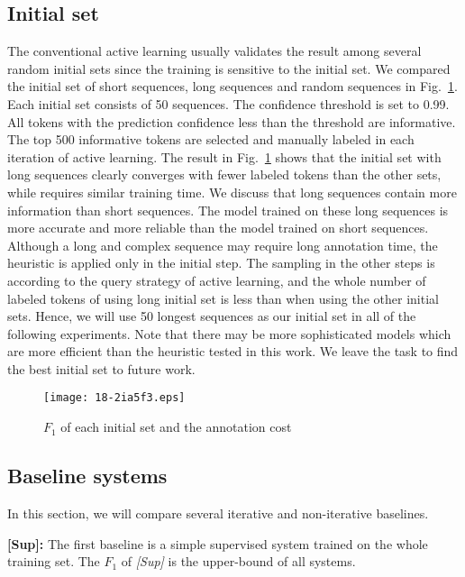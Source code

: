 \documentclass[english]{jnlp_JS2.0}
\begin{document}
\subsection{Initial set}
\label{InitialQuery}

The conventional active learning usually validates the result among several random initial sets since the training is sensitive to the initial set. We compared the initial set of short sequences, long sequences and random sequences in Fig.~\ref{Fig:InitSet}. Each initial set consists of 50 sequences. The confidence threshold is set to 0.99. All tokens with the prediction confidence less than the threshold are informative. The top 500 informative tokens are selected and manually labeled in each iteration of active learning. The result in Fig.~\ref{Fig:InitSet} shows that the initial set with long sequences clearly converges with fewer labeled tokens than the other sets, while requires similar training time. We discuss that long sequences contain more information than short sequences. The model trained on these long sequences is more accurate and more reliable than the model trained on short sequences. Although a long and complex sequence may require long annotation time, the heuristic is applied only in the initial step. The sampling in the other steps is according to the query strategy of active learning, and the whole number of labeled tokens of using long initial set is less than when using the other initial sets. Hence, we will use 50 longest sequences as our initial set in all of the following experiments. Note that there may be more sophisticated models which are more efficient than the heuristic tested in this work. We leave the task to find the best initial set to future work.

\begin{figure}[t]
\begin{center}
\texttt{[image: 18-2ia5f3.eps]}
\end{center}
\caption{$F_1$ of each initial set and the annotation cost}
\label{Fig:InitSet}
\end{figure}


\subsection{Baseline systems}

In this section, we will compare several iterative and non-iterative baselines.

\textbf{[Sup]:} The first baseline is a simple supervised system trained on the whole training set. The $F_1$ of \textit{[Sup]} is the upper-bound of all systems.
\end{document}
